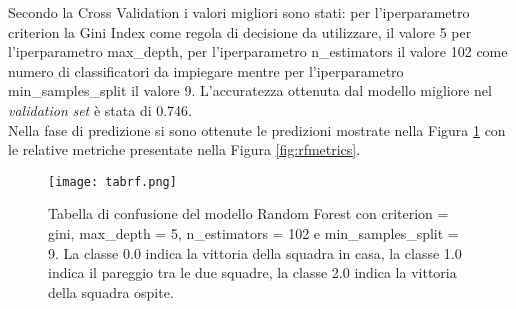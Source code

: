 Secondo la Cross Validation i valori migliori sono stati: per l'iperparametro \textsf{criterion} la Gini Index come regola di decisione da utilizzare, il valore 5 per l'iperparametro \textsf{max\_depth}, per l'iperparametro \textsf{n\_estimators} il valore 102 come numero di classificatori da impiegare mentre per l'iperparametro \textsf{min\_samples\_split} il valore 9.
L'accuratezza ottenuta dal modello migliore nel \emph{validation} \emph{set} è stata di 0.746.\\
Nella fase di predizione si sono ottenute le predizioni mostrate nella Figura \ref{fig:tabrf} con le relative metriche presentate nella Figura \ref{fig:rfmetrics}.
\begin{figure}[h]
	\begin{center}
		\texttt{[image: tabrf.png]}
		\caption{Tabella di confusione del modello Random Forest con \textsf{criterion} = gini, \textsf{max\_depth} = 5, \textsf{n\_estimators} = 102 e \textsf{min\_samples\_split} = 9. La classe 0.0 indica la vittoria della squadra in casa, la classe 1.0 indica il pareggio tra le due squadre, la classe 2.0 indica la vittoria della squadra ospite.
		} 
		\label{fig:tabrf}
	\end{center}
\end{figure}

